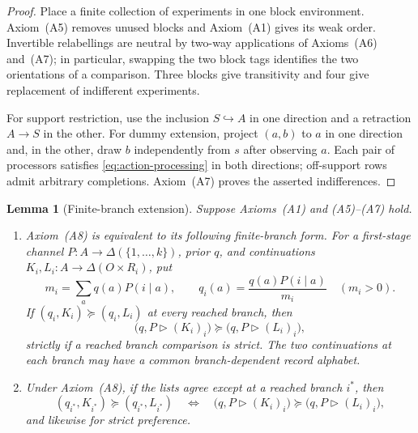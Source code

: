 \documentclass[11pt,a4paper]{article}
\newtheorem{lemma}[theorem]{Lemma}
\theoremstyle{definition}
\newcommand{\D}{\Delta}
\newcommand{\1}{\mathbf 1}
\begin{document}
\begin{proof}
Place a finite collection of experiments in one block environment.
Axiom~\textup{(A5)} removes unused blocks and Axiom~\textup{(A1)} gives its
weak order.  Invertible relabellings are neutral by two-way applications of
Axioms~\textup{(A6)} and~\textup{(A7)}; in particular, swapping the two
block tags identifies the two orientations of a comparison.  Three blocks
give transitivity and four give replacement of indifferent experiments.

For support restriction, use the inclusion $S\hookrightarrow A$ in one
direction and a retraction $A\to S$ in the other.  For dummy extension,
project $(a,b)$ to $a$ in one direction and, in the other, draw $b$ independently
from $s$ after observing $a$.  Each pair of processors satisfies
\eqref{eq:action-processing} in both directions; off-support rows admit
arbitrary completions.  Axiom~\textup{(A7)} proves the asserted indifferences.
\end{proof}

\begin{lemma}[Finite-branch extension]\label{pt:lem:finite-branch-extension}
Suppose Axioms~\textup{(A1)} and \textup{(A5)--(A7)} hold.
\begin{enumerate}[label=\textup{(\alph*)},leftmargin=*]
\item Axiom~\textup{(A8)} is equivalent to its following finite-branch form.
For a first-stage channel $P:A\to\D(\{1,\ldots,k\})$, prior $q$, and
continuations $K_i,L_i:A\to\D(O\times R_i)$, put
\[
m_i=\sum_a q(a)P(i\mid a),\qquad
q_i(a)=\frac{q(a)P(i\mid a)}{m_i}\quad(m_i>0).
\]
If $(q_i,K_i)\succeq(q_i,L_i)$ at every reached branch, then
\begin{equation}
\bigl(q,P\triangleright(K_i)_i\bigr)
\succeq\bigl(q,P\triangleright(L_i)_i\bigr),
\label{pt:eq:finite-branch-extension}
\end{equation}
strictly if a reached branch comparison is strict.  The two continuations at
each branch may have a common branch-dependent record alphabet.
\item Under Axiom~\textup{(A8)}, if the lists agree except at a reached
branch $i^*$, then
\[
(q_{i^*},K_{i^*})\succeq(q_{i^*},L_{i^*})
\quad\Longleftrightarrow\quad
\bigl(q,P\triangleright(K_i)_i\bigr)
\succeq\bigl(q,P\triangleright(L_i)_i\bigr),
\]
and likewise for strict preference.
\end{enumerate}
\end{lemma}
\end{document}
